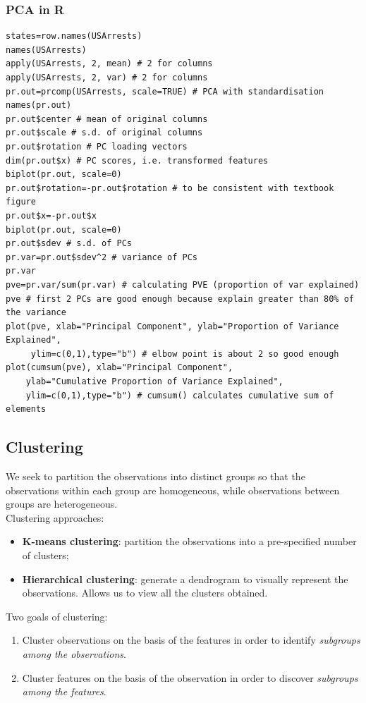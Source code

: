 \documentclass[11pt]{article}
\begin{document}
\subsubsection{PCA in R}
\begin{lstlisting}
states=row.names(USArrests)
names(USArrests)
apply(USArrests, 2, mean) # 2 for columns
apply(USArrests, 2, var) # 2 for columns
pr.out=prcomp(USArrests, scale=TRUE) # PCA with standardisation
names(pr.out)
pr.out$center # mean of original columns
pr.out$scale # s.d. of original columns
pr.out$rotation # PC loading vectors
dim(pr.out$x) # PC scores, i.e. transformed features
biplot(pr.out, scale=0)
pr.out$rotation=-pr.out$rotation # to be consistent with textbook figure
pr.out$x=-pr.out$x
biplot(pr.out, scale=0)
pr.out$sdev # s.d. of PCs
pr.var=pr.out$sdev^2 # variance of PCs
pr.var
pve=pr.var/sum(pr.var) # calculating PVE (proportion of var explained)
pve # first 2 PCs are good enough because explain greater than 80% of the variance
plot(pve, xlab="Principal Component", ylab="Proportion of Variance Explained", 
     ylim=c(0,1),type="b") # elbow point is about 2 so good enough
plot(cumsum(pve), xlab="Principal Component",
    ylab="Cumulative Proportion of Variance Explained",
    ylim=c(0,1),type="b") # cumsum() calculates cumulative sum of elements
\end{lstlisting}

\subsection{Clustering}
\noindent We seek to partition the observations into distinct groups so that the observations within each group are homogeneous, while observations between groups are heterogeneous. \\

\noindent Clustering approaches:
\begin{itemize}
    \item \textbf{K-means clustering}: partition the observations into a pre-specified number of clusters;
    \item \textbf{Hierarchical clustering}: generate a dendrogram to visually represent the observations. Allows us to view all the clusters obtained.
\end{itemize} \phantom{i}

\noindent Two goals of clustering:
\begin{enumerate}
    \item Cluster observations on the basis of the features in order to identify \textit{subgroups among the observations}.
    \item Cluster features on the basis of the observation in order to discover \textit{subgroups among the features}.
\end{enumerate}
\end{document}
